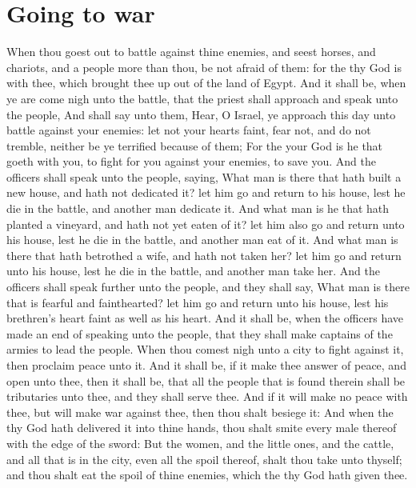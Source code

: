 \section*{Going to war}
\begin{biblechapter} %
\verse When thou goest out to battle against thine enemies, and seest horses, and chariots, and a people more than thou, be not afraid of them: for the \LORD thy God is with thee, which brought thee up out of the land of Egypt.
\verse And it shall be, when ye are come nigh unto the battle, that the priest shall approach and speak unto the people,
\verse And shall say unto them, Hear, O Israel, ye approach this day unto battle against your enemies: let not your hearts faint, fear not, and do not tremble, neither be ye terrified because of them;
\verse For the \LORD your God is he that goeth with you, to fight for you against your enemies, to save you.
\verse And the officers shall speak unto the people, saying, What man is there that hath built a new house, and hath not dedicated it? let him go and return to his house, lest he die in the battle, and another man dedicate it.
\verse And what man is he that hath planted a vineyard, and hath not yet eaten of it? let him also go and return unto his house, lest he die in the battle, and another man eat of it.
\verse And what man is there that hath betrothed a wife, and hath not taken her? let him go and return unto his house, lest he die in the battle, and another man take her.
\verse And the officers shall speak further unto the people, and they shall say, What man is there that is fearful and fainthearted? let him go and return unto his house, lest his brethren's heart faint as well as his heart.
\verse And it shall be, when the officers have made an end of speaking unto the people, that they shall make captains of the armies to lead the people.
\verse When thou comest nigh unto a city to fight against it, then proclaim peace unto it.
\verse And it shall be, if it make thee answer of peace, and open unto thee, then it shall be, that all the people that is found therein shall be tributaries unto thee, and they shall serve thee.
\verse And if it will make no peace with thee, but will make war against thee, then thou shalt besiege it:
\verse And when the \LORD thy God hath delivered it into thine hands, thou shalt smite every male thereof with the edge of the sword:
\verse But the women, and the little ones, and the cattle, and all that is in the city, even all the spoil thereof, shalt thou take unto thyself; and thou shalt eat the spoil of thine enemies, which the \LORD thy God hath given thee.

\end{biblechapter}
